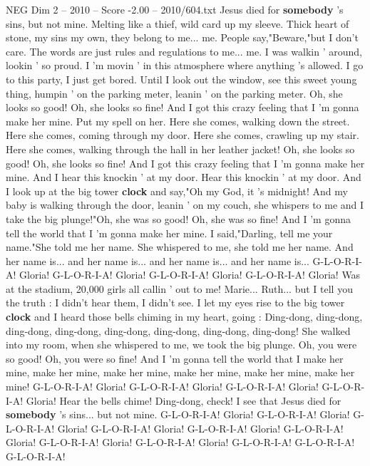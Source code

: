 \begin{textsample}{NEG Dim 2 – 2010 – Score -2.00 – 2010/604.txt}  \label{ex:f2_neg_013}
Jesus died for \textbf{somebody} 's sins, but not mine.
Melting like a thief, wild card up my sleeve.
Thick heart of stone, my sins my own, they belong to me... me.
People say,"Beware,"but I don't care.
The words are just rules and regulations to me... me.
I was walkin ' around, lookin ' so proud.
I 'm movin ' in this atmosphere where anything 's allowed.
I go to this party, I just get bored.
Until I look out the window, see this sweet young thing, humpin ' on the parking meter, leanin ' on the parking meter.
Oh, she looks so good!
Oh, she looks so fine!
And I got this crazy feeling that I 'm gonna make her mine.
Put my spell on her.
Here she comes, walking down the street.
Here she comes, coming through my door.
Here she comes, crawling up my stair.
Here she comes, walking through the hall in her leather jacket!
Oh, she looks so good!
Oh, she looks so fine!
And I got this crazy feeling that I 'm gonna make her mine.
And I hear this knockin ' at my door.
Hear this knockin ' at my door.
And I look up at the big tower \textbf{clock} and say,"Oh my God, it 's midnight!
And my baby is walking through the door, leanin ' on my couch, she whispers to me and I take the big plunge!"Oh, she was so good!
Oh, she was so fine!
And I 'm gonna tell the world that I 'm gonna make her mine.
I said,"Darling, tell me your name."She told me her name.
She whispered to me, she told me her name.
And her name is... and her name is... and her name is... and her name is...
G-L-O-R-I-A!
Gloria!
G-L-O-R-I-A!
Gloria!
G-L-O-R-I-A!
Gloria!
G-L-O-R-I-A!
Gloria!
Was at the stadium, 20,000 girls all callin ' out to me!
Marie...
Ruth... but I tell you the truth : I didn't hear them, I didn't see.
I let my eyes rise to the big tower \textbf{clock} and I heard those bells chiming in my heart, going : Ding-dong, ding-dong, ding-dong, ding-dong, ding-dong, ding-dong, ding-dong, ding-dong!
She walked into my room, when she whispered to me, we took the big plunge.
Oh, you were so good!
Oh, you were so fine!
And I 'm gonna tell the world that I make her mine, make her mine, make her mine, make her mine, make her mine, make her mine!
G-L-O-R-I-A!
Gloria!
G-L-O-R-I-A!
Gloria!
G-L-O-R-I-A!
Gloria!
G-L-O-R-I-A!
Gloria!
Hear the bells chime!
Ding-dong, check!
I see that Jesus died for \textbf{somebody} 's sins... but not mine.
G-L-O-R-I-A!
Gloria!
G-L-O-R-I-A!
Gloria!
G-L-O-R-I-A!
Gloria!
G-L-O-R-I-A!
Gloria!
G-L-O-R-I-A!
Gloria!
G-L-O-R-I-A!
Gloria!
G-L-O-R-I-A!
Gloria!
G-L-O-R-I-A!
Gloria!
G-L-O-R-I-A!
G-L-O-R-I-A!
G-L-O-R-I-A!

\end{textsample}
